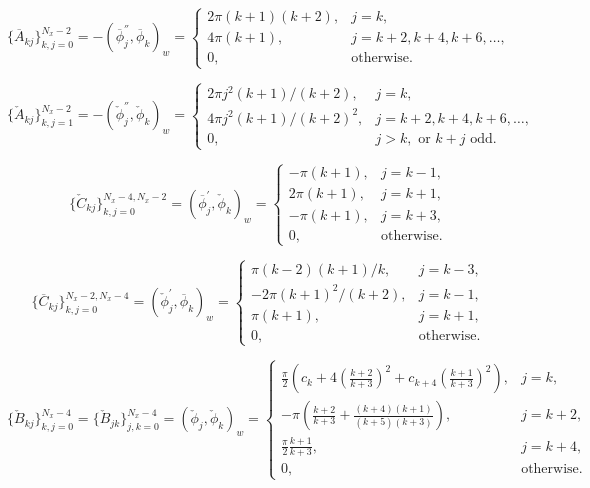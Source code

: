\documentclass[11pt, oneside]{article}
\newcommand{\N}[1]{\check{#1}}
\newcommand{\D}[1]{\overline{#1}}
\begin{document}
\begin{equation}
 \{\D{A}_{kj}\}_{k,j=0}^{N_x-2} = -\left(\D{\phi}^{''}_{j}, \D{\phi}_{k} \right)_w = \begin{cases}
 2\pi(k+1)(k+2), &j=k,\\
 4\pi(k+1), & j=k+2, k+4, k+6, \ldots, \\
 0, &\text{otherwise}.
 \end{cases}
\end{equation}

\begin{equation}
 \{\N{A}_{kj}\}_{k,j=1}^{N_x-2} = -\left(\N{\phi}^{''}_{j}, \N{\phi}_{k} \right)_w = \begin{cases}
 2\pi j^2(k+1)/(k+2), &j=k,\\
 4\pi j^2(k+1)/(k+2)^2, & j=k+2, k+4, k+6, \ldots, \\
 0, &j>k, \text{ or } k+j \text{ odd}.
 \end{cases}
\end{equation}

\begin{equation}
 \{\N{C}_{kj}\}_{k,j=0}^{N_x-4, N_x-2} = \left(\D{\phi}^{'}_j, \N{\phi}_k 
 \right)_w = \begin{cases}
 -\pi(k+1), &j=k-1,\\
 2\pi(k+1), & j=k+1, \\
 -\pi(k+1), & j=k+3, \\
 0, &\text{otherwise}.
 \end{cases}
\end{equation}

\begin{equation}
 \{\D{C}_{kj}\}_{k,j=0}^{N_x-2, N_x-4} = \left(\N{\phi}^{'}_j, \D{\phi}_k 
 \right)_w = \begin{cases}
 \pi (k-2)(k+1)/k, &j=k-3,\\
 -2 \pi(k+1)^2/(k+2), & j=k-1, \\
 \pi(k+1), & j=k+1, \\
 0, &\text{otherwise}.
 \end{cases}
\end{equation}

\begin{equation}
 \{\N{B}_{kj}\}_{k,j=0}^{N_x-4} = \{\N{B}_{jk}\}_{j,k=0}^{N_x-4} = (\N{\phi}_j, 
 \N{\phi}_k)_w = \begin{cases}
 \frac{\pi}{2} \left(c_k + 4 \left(\frac{k+2}{k+3} \right)^2 + c_{k+4} 
 \left(\frac{k+1}{k+3}\right)^2    \right), &j=k,\\
 -\pi \left( \frac{k+2}{k+3} + \frac{(k+4)(k+1)}{(k+5)(k+3)} \right), &j=k+2,\\
 \frac{\pi}{2} \frac{k+1}{k+3} , & j=k+4, \\
 0, &\text{otherwise}.
 \end{cases}
\end{equation}
\end{document}
